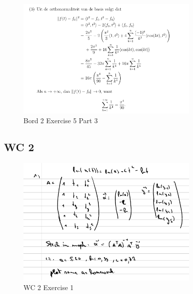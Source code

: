 \documentclass[a4paper]{report}
\begin{document}
\begin{figure}[H]
	\centering
	\includegraphics[width=0.8\textwidth]{assets/bord_2_ex_5_part_3.png}
	\caption{Bord 2 Exercise 5 Part 3}
	\label{fig:bord_2_ex_5_part_3}
\end{figure}

\subsection*{WC 2}

\begin{figure}[H]
	\centering
	\includegraphics[width=0.8\textwidth]{images/wc_2_ex_1.png}
	\caption{WC 2 Exercise 1}
	\label{fig:wc_2_ex_1}
\end{figure}
\end{document}

